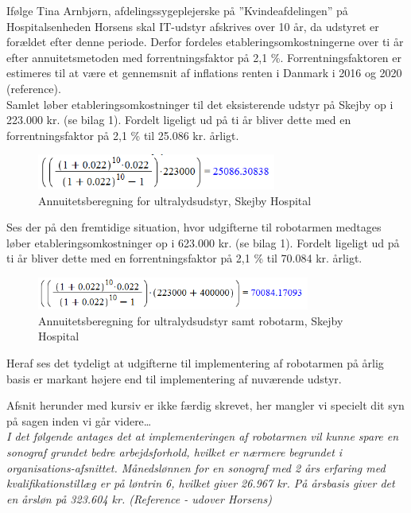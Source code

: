 Ifølge Tina Arnbjørn, afdelingssygeplejerske på ”Kvindeafdelingen” på Hospitalsenheden Horsens skal IT-udstyr afskrives over 10 år, da udstyret er forældet efter denne periode. Derfor fordeles etableringsomkostningerne over ti år efter annuitetsmetoden med forrentningsfaktor på 2,1 \%. Forrentningsfaktoren er estimeres til at være et gennemsnit af inflations renten i Danmark i 2016 og 2020 (reference). \\
Samlet løber etableringsomkostninger til det eksisterende udstyr på Skejby op i 223.000 kr. (se bilag 1). Fordelt ligeligt ud på ti år bliver dette med en forrentningsfaktor på 2,1 \% til 25.086 kr. årligt.
\begin{figure}[H]\centering
	\includegraphics[width = 0.7\textwidth]{Figurer/SkejbyOkonomi}
	\caption{Annuitetsberegning for ultralydsudstyr, Skejby Hospital}
	\label{SkejbyOkonomi}
\end{figure}
Ses der på den fremtidige situation, hvor udgifterne til robotarmen medtages løber etableringsomkostninger op i 623.000 kr. (se bilag 1). Fordelt ligeligt ud på ti år bliver dette med en forrentningsfaktor på 2,1 \% til 70.084 kr. årligt. 
\begin{figure}[H]\centering
	\includegraphics[width = 0.8\textwidth]{Figurer/SkejbyRobotOkonomi}
	\caption{Annuitetsberegning for ultralydsudstyr samt robotarm, Skejby Hospital}
	\label{SkejbyRobotOkonomi}
\end{figure}
Heraf ses det tydeligt at udgifterne til implementering af robotarmen på årlig basis er markant højere end til implementering af nuværende udstyr. 

Afsnit herunder med kursiv er ikke færdig skrevet, her mangler vi specielt dit syn på sagen inden vi går videre… \\
\textit{I det følgende antages det at implementeringen af robotarmen vil kunne spare en sonograf grundet bedre arbejdsforhold, hvilket er nærmere begrundet i organisations-afsnittet. Månedslønnen for en sonograf med 2 års erfaring med kvalifikationstillæg er på løntrin 6, hvilket giver 26.967 kr. På årsbasis giver det en årsløn på 323.604 kr.  (Reference - udover Horsens)}

